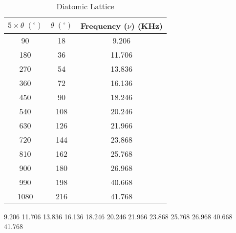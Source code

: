 \begin{table}[h]
	\centering
	\begin{tabular}{|c|c|c|}
	\hline
	\textbf{$5\times\theta\;(^\circ)$} & \textbf{$\theta\;(^\circ)$} & \textbf{Frequency ($\nu$) (KHz)} \\ \hline
	90 & 18 & 9.206 \\ \hline
	180 & 36 & 11.706 \\ \hline
	270 & 54 & 13.836 \\ \hline
	360 & 72 & 16.136 \\ \hline
	450 & 90 & 18.246 \\ \hline
	540 & 108 & 20.246 \\ \hline
	630 & 126 & 21.966 \\ \hline
	720 & 144 & 23.868 \\ \hline
	810 & 162 & 25.768 \\ \hline
	900 & 180 & 26.968 \\ \hline
	990 & 198 & 40.668 \\ \hline
	1080 & 216 & 41.768 \\ \hline
	\end{tabular}
	\caption{Diatomic Lattice}
	\label{tab:di}
\end{table}









9.206
11.706
13.836
16.136
18.246
20.246
21.966
23.868
25.768
26.968
40.668
41.768